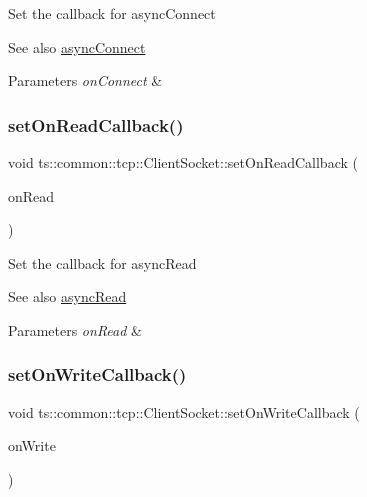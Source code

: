 Set the callback for async\+Connect \begin{DoxySeeAlso}{See also}
\hyperlink{classts_1_1common_1_1tcp_1_1_client_socket_a6e852eb6629afd2fa253ccd3fd8a591a}{async\+Connect} 
\end{DoxySeeAlso}

\begin{DoxyParams}{Parameters}
{\em on\+Connect} & \\
\hline
\end{DoxyParams}
\mbox{\label{classts_1_1common_1_1tcp_1_1_client_socket_a0fdc353f373b36eba7096ca88b957842}} 
\subsubsection{\texorpdfstring{set\+On\+Read\+Callback()}{setOnReadCallback()}}
{\footnotesize\ttfamily void ts\+::common\+::tcp\+::\+Client\+Socket\+::set\+On\+Read\+Callback (\begin{DoxyParamCaption}\item[{On\+Read\+Func}]{on\+Read }\end{DoxyParamCaption})}

Set the callback for async\+Read \begin{DoxySeeAlso}{See also}
\hyperlink{classts_1_1common_1_1tcp_1_1_client_socket_afea6b565d0621b6d19648c0259b85e95}{async\+Read} 
\end{DoxySeeAlso}

\begin{DoxyParams}{Parameters}
{\em on\+Read} & \\
\hline
\end{DoxyParams}
\mbox{\label{classts_1_1common_1_1tcp_1_1_client_socket_a6dc4758bd4b328dec0ee8cbc1a39820b}} 
\subsubsection{\texorpdfstring{set\+On\+Write\+Callback()}{setOnWriteCallback()}}
{\footnotesize\ttfamily void ts\+::common\+::tcp\+::\+Client\+Socket\+::set\+On\+Write\+Callback (\begin{DoxyParamCaption}\item[{On\+Write\+Func}]{on\+Write }\end{DoxyParamCaption})}

